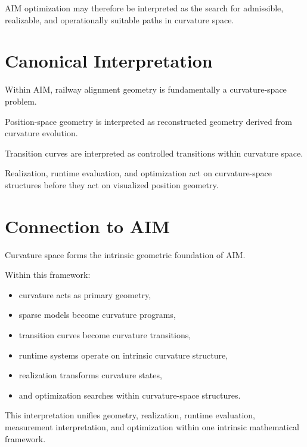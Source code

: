 AIM optimization may therefore be interpreted as the search for
admissible, realizable, and operationally suitable paths in curvature
space.

\section{Canonical Interpretation}

\begin{proposition}
Within AIM, railway alignment geometry is fundamentally a curvature-space
problem.
\end{proposition}

\begin{proposition}
Position-space geometry is interpreted as reconstructed geometry derived
from curvature evolution.
\end{proposition}

\begin{proposition}
Transition curves are interpreted as controlled transitions within
curvature space.
\end{proposition}

\begin{proposition}
Realization, runtime evaluation, and optimization act on curvature-space
structures before they act on visualized position geometry.
\end{proposition}

\section{Connection to AIM}

\begin{summary}
Curvature space forms the intrinsic geometric foundation of AIM.

Within this framework:
\begin{itemize}
\item curvature acts as primary geometry,
\item sparse models become curvature programs,
\item transition curves become curvature transitions,
\item runtime systems operate on intrinsic curvature structure,
\item realization transforms curvature states,
\item and optimization searches within curvature-space structures.
\end{itemize}

This interpretation unifies geometry, realization, runtime evaluation,
measurement interpretation, and optimization within one intrinsic
mathematical framework.
\end{summary}
